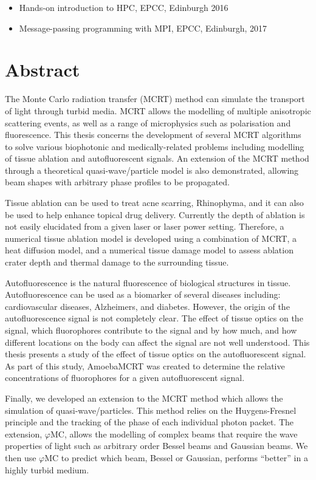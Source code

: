 \documentclass[10pt,a4paper,twoside]{book}
\begin{document}
\begin{itemize}
\item Hands-on introduction to HPC, EPCC, Edinburgh 2016
\item Message-passing programming with MPI, EPCC, Edinburgh, 2017
\end{itemize}

\chapter{Abstract}
The Monte Carlo radiation transfer (MCRT) method can simulate the transport of light through turbid media.
MCRT allows the modelling of multiple anisotropic scattering events, as well as a range of microphysics such as polarisation and fluorescence.
This thesis concerns the development of several MCRT algorithms to solve various biophotonic and medically-related problems including modelling of tissue ablation and autofluorescent signals.
An extension of the MCRT method through a theoretical quasi-wave/particle model is also demonstrated, allowing beam shapes with arbitrary phase profiles to be propagated.

Tissue ablation can be used to treat acne scarring, Rhinophyma, and it can also be used to help enhance topical drug delivery.
Currently the depth of ablation is not easily elucidated from a given laser or laser power setting.
Therefore, a numerical tissue ablation model is developed using a combination of MCRT, a heat diffusion model, and a numerical tissue damage model to assess ablation crater depth and thermal damage to the surrounding tissue.

Autofluorescence is the natural fluorescence of biological structures in tissue.
Autofluorescence can be used as a biomarker of several diseases including: cardiovascular diseases, Alzheimers, and diabetes.
However, the origin of the autofluorescence signal is not completely clear.
The effect of tissue optics on the signal, which fluorophores contribute to the signal and by how much, and how different locations on the body can affect the signal are not well understood.
This thesis presents a study of the effect of tissue optics on the autofluorescent signal.
As part of this study, AmoebaMCRT was created to determine the relative concentrations of fluorophores for a given autofluorescent signal.

Finally, we developed an extension to the MCRT method which allows the simulation of quasi-wave/particles.
This method relies on the Huygens-Fresnel principle and the tracking of the phase of each individual photon packet.
The extension, $\varphi$MC, allows the modelling of complex beams that require the wave properties of light such as arbitrary order Bessel beams and Gaussian beams.
We then use $\varphi$MC to predict which beam, Bessel or Gaussian, performs ``better'' in a highly turbid medium.
\end{document}
